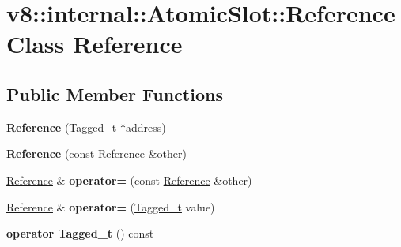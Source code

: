 \hypertarget{classv8_1_1internal_1_1AtomicSlot_1_1Reference}{}\section{v8\+:\+:internal\+:\+:Atomic\+Slot\+:\+:Reference Class Reference}
\label{classv8_1_1internal_1_1AtomicSlot_1_1Reference}
\subsection*{Public Member Functions}
\begin{DoxyCompactItemize}
\item 
\mbox{\label{classv8_1_1internal_1_1AtomicSlot_1_1Reference_a6e103cf66d58043d41e210eabf718ad9}} 
{\bfseries Reference} (\mbox{\hyperlink{classuintptr__t}{Tagged\+\_\+t}} $\ast$address)
\item 
\mbox{\label{classv8_1_1internal_1_1AtomicSlot_1_1Reference_a0f468af86350baddcdf6d26a4efb6301}} 
{\bfseries Reference} (const \mbox{\hyperlink{classv8_1_1internal_1_1AtomicSlot_1_1Reference}{Reference}} \&other)
\item 
\mbox{\label{classv8_1_1internal_1_1AtomicSlot_1_1Reference_a27d970222078764a9789d60822293e66}} 
\mbox{\hyperlink{classv8_1_1internal_1_1AtomicSlot_1_1Reference}{Reference}} \& {\bfseries operator=} (const \mbox{\hyperlink{classv8_1_1internal_1_1AtomicSlot_1_1Reference}{Reference}} \&other)
\item 
\mbox{\label{classv8_1_1internal_1_1AtomicSlot_1_1Reference_a82ee8d59c538af0e5ddc8d2cb1695166}} 
\mbox{\hyperlink{classv8_1_1internal_1_1AtomicSlot_1_1Reference}{Reference}} \& {\bfseries operator=} (\mbox{\hyperlink{classuintptr__t}{Tagged\+\_\+t}} value)
\item 
\mbox{\label{classv8_1_1internal_1_1AtomicSlot_1_1Reference_a3dca960a1e4ad610ef615eb321c36fa2}} 
{\bfseries operator Tagged\+\_\+t} () const
\item 
\mbox{\label{classv8_1_1internal_1_1AtomicSlot_1_1Reference_a4533cb1896de222265f6c04c57fa9eae}} 

\end{DoxyCompactItemize}
